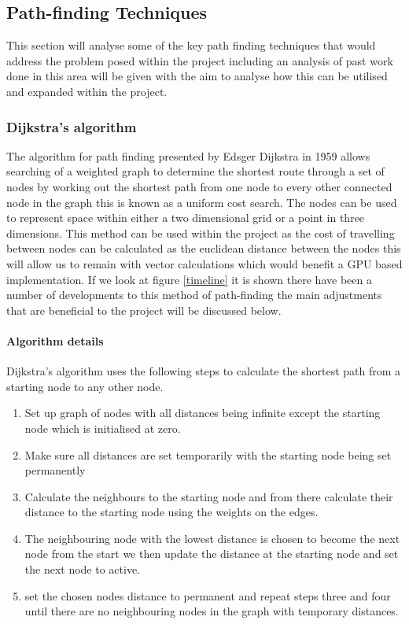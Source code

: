 \subsection{Path-finding Techniques}
This section will analyse some of the key path finding techniques that would address the problem posed within the project including an analysis of past work done in this area will be given with the aim to analyse how this can be utilised and expanded within the project. 
\subsubsection{Dijkstra's algorithm}
The algorithm for path finding presented by Edsger Dijkstra in 1959 \cite{dijkstra} allows searching of a weighted graph to determine the shortest route through a set of nodes by working out the shortest path from one node to every other connected node in the graph this is known as a uniform cost search. The nodes can be used to represent space within either a two dimensional grid or a point in three dimensions. This method can be used within the project as the cost of travelling between nodes can be calculated as the euclidean distance between the nodes this will allow us to remain with vector calculations which would benefit a GPU based implementation. If we look at figure \ref{timeline} it is shown there have been a number of developments to this method of path-finding the main adjustments that are beneficial to the project will be discussed below.
\paragraph{Algorithm details}
Dijkstra's algorithm uses the following steps to calculate the shortest path from a starting node to any other node.

\begin{enumerate}
	\item Set up graph of nodes with all distances being infinite except the starting node which is initialised at zero.
	\item Make sure all distances are set temporarily with the starting node being set permanently
	\item Calculate the neighbours to the starting node and from there calculate their distance to the starting node using the weights on the edges.
	\item The neighbouring node with the lowest distance is chosen to become the next node from the start we then update the distance at the starting node and set the next node to active.
	\item set the chosen nodes distance to permanent and repeat steps three and four until there are no neighbouring nodes in the graph with temporary distances.      
\end{enumerate}
 

